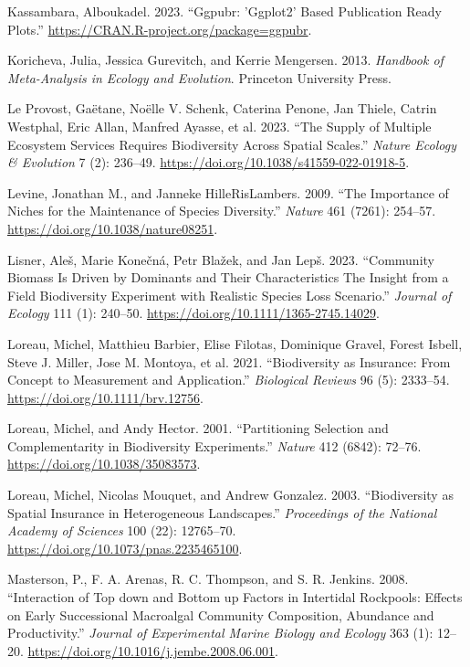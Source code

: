 \documentclass[
  letterpaper,
  DIV=11,
  numbers=noendperiod]{scrartcl}
\newlength{\cslhangindent}
\newenvironment{CSLReferences}[2] %
 {\begin{list}{}{%
  \setlength{\itemindent}{0pt}
  \setlength{\leftmargin}{0pt}
  \setlength{\parsep}{0pt}
  \ifodd #1
   \setlength{\leftmargin}{\cslhangindent}
   \setlength{\itemindent}{-1\cslhangindent}
  \fi
  \setlength{\itemsep}{#2\baselineskip}}}
 {\end{list}}
\begin{document}
\begin{CSLReferences}{1}{0}
Kassambara, Alboukadel. 2023. {``Ggpubr: 'Ggplot2' Based Publication
Ready Plots.''} \url{https://CRAN.R-project.org/package=ggpubr}.

Koricheva, Julia, Jessica Gurevitch, and Kerrie Mengersen. 2013.
\emph{Handbook of Meta-Analysis in Ecology and Evolution}. Princeton
University Press.

Le Provost, Gaëtane, Noëlle V. Schenk, Caterina Penone, Jan Thiele,
Catrin Westphal, Eric Allan, Manfred Ayasse, et al. 2023. {``The Supply
of Multiple Ecosystem Services Requires Biodiversity Across Spatial
Scales.''} \emph{Nature Ecology \& Evolution} 7 (2): 236--49.
\url{https://doi.org/10.1038/s41559-022-01918-5}.

Levine, Jonathan M., and Janneke HilleRisLambers. 2009. {``The
Importance of Niches for the Maintenance of Species Diversity.''}
\emph{Nature} 461 (7261): 254--57.
\url{https://doi.org/10.1038/nature08251}.

Lisner, Aleš, Marie Konečná, Petr Blažek, and Jan Lepš. 2023.
{``Community Biomass Is Driven by Dominants and Their Characteristics
{\textendash} The Insight from a Field Biodiversity Experiment with
Realistic Species Loss Scenario.''} \emph{Journal of Ecology} 111 (1):
240--50. \url{https://doi.org/10.1111/1365-2745.14029}.

Loreau, Michel, Matthieu Barbier, Elise Filotas, Dominique Gravel,
Forest Isbell, Steve J. Miller, Jose M. Montoya, et al. 2021.
{``Biodiversity as Insurance: From Concept to Measurement and
Application.''} \emph{Biological Reviews} 96 (5): 2333--54.
\url{https://doi.org/10.1111/brv.12756}.

Loreau, Michel, and Andy Hector. 2001. {``Partitioning Selection and
Complementarity in Biodiversity Experiments.''} \emph{Nature} 412
(6842): 72--76. \url{https://doi.org/10.1038/35083573}.

Loreau, Michel, Nicolas Mouquet, and Andrew Gonzalez. 2003.
{``Biodiversity as Spatial Insurance in Heterogeneous Landscapes.''}
\emph{Proceedings of the National Academy of Sciences} 100 (22):
12765--70. \url{https://doi.org/10.1073/pnas.2235465100}.

Masterson, P., F. A. Arenas, R. C. Thompson, and S. R. Jenkins. 2008.
{``Interaction of Top down and Bottom up Factors in Intertidal
Rockpools: Effects on Early Successional Macroalgal Community
Composition, Abundance and Productivity.''} \emph{Journal of
Experimental Marine Biology and Ecology} 363 (1): 12--20.
\url{https://doi.org/10.1016/j.jembe.2008.06.001}.


\end{CSLReferences}
\end{document}
